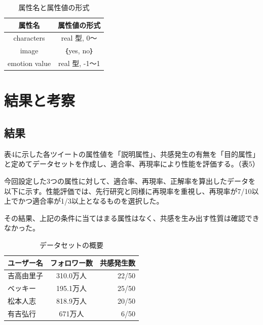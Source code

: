 \documentclass[dvipdfmx]{issj}
\begin{document}
\begin{table}[t]\centering
\caption{属性名と属性値の形式}\label{tbl:font}
\begin{small}
\begin{tabular}{|c|c|} \hline
属性名            & 属性値の形式\\\hline\hline
characters         & real 型, 0～\\\hline
image & ｛yes, no｝\\\hline
emotion value     &  real 型, -1～1\\\hline
\end{tabular}
\end{small}
\end{table}



\section{結果と考察}  %


\subsection{結果}  %
表4に示した各ツイートの属性値を「説明属性」、共感発生の有無を「目的属性」と定めてデータセットを作成し、適合率、再現率により性能を評価する。（表5）

今回設定した3つの属性に対して、適合率、再現率、正解率を算出したデータを以下に示す。性能評価では、先行研究と同様に再現率を重視し、再現率が7/10以上でかつ適合率が1/3以上となるものを選択した。

その結果、上記の条件に当てはまる属性はなく、共感を生み出す性質は確認できなかった。



\begin{table}[t]
  \caption{データセットの概要}
  \label{table:data_type}
  \centering
  \begin{tabular}{lcr}
    \hline
   ユーザー名 & フォロワー数  &  共感発生数  \\
    \hline \hline
吉高由里子 & 310.0万人 &  22/50  \\
ベッキー & 195.1万人 &  25/50  \\
松本人志 & 818.9万人 &  20/50  \\
有吉弘行 & 671万人 &  6/50 \\
    \hline
  \end{tabular}
\end{table}
\end{document}
